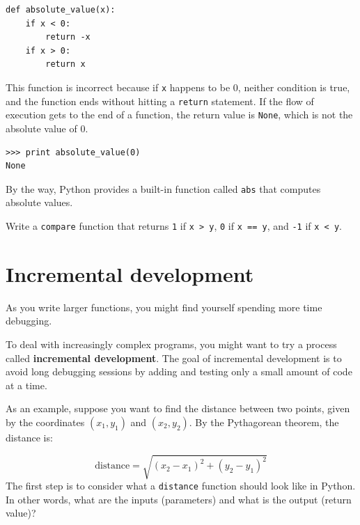 \documentclass[10pt]{book}
\begin{document}
\begin{CJK}{UTF8}{gbsn}
\begin{verbatim}
def absolute_value(x):
    if x < 0:
        return -x
    if x > 0:
        return x
\end{verbatim}
%
This function is incorrect because if {\tt x} happens to be 0,
neither condition is true, and the function ends without hitting a
{\tt return} statement.  If the flow of execution gets to the end
of a function, the return value is {\tt None}, which is not
the absolute value of 0.

\begin{verbatim}
>>> print absolute_value(0)
None
\end{verbatim}
%
By the way, Python provides a built-in function called 
{\tt abs} that computes absolute values.

\begin{exercise}

Write a {\tt compare} function
that returns {\tt 1} if {\tt x > y},
{\tt 0} if {\tt x == y}, and {\tt -1} if {\tt x < y}.
\end{exercise}


\section{Incremental development}
\label{incremental.development}

As you write larger functions, you might find yourself
spending more time debugging.

To deal with increasingly complex programs,
you might want to try a process called
{\bf incremental development}.  The goal of incremental development
is to avoid long debugging sessions by adding and testing only
a small amount of code at a time.

As an example, suppose you want to find the distance between two
points, given by the coordinates $(x_1, y_1)$ and $(x_2, y_2)$.
By the Pythagorean theorem, the distance is:

\begin{displaymath}
\mathrm{distance} = \sqrt{(x_2 - x_1)^2 + (y_2 - y_1)^2}
\end{displaymath}
%
The first step is to consider what a {\tt distance} function should
look like in Python.  In other words, what are the inputs (parameters)
and what is the output (return value)?


\end{CJK}
\end{document}
